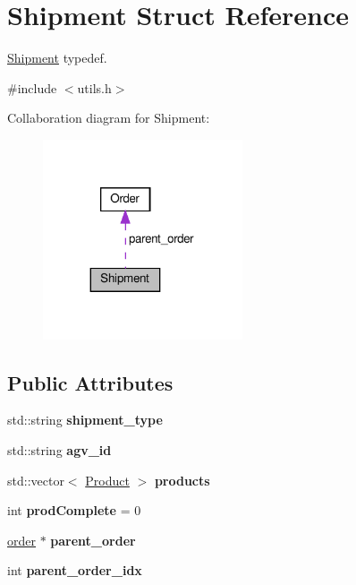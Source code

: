 \hypertarget{structShipment}{}\section{Shipment Struct Reference}
\label{structShipment}


\hyperlink{structShipment}{Shipment} typedef.  




{\ttfamily \#include $<$utils.\+h$>$}



Collaboration diagram for Shipment\+:\nopagebreak
\begin{figure}[H]
\begin{center}
\leavevmode
\includegraphics[width=167pt]{structShipment__coll__graph}
\end{center}
\end{figure}
\subsection*{Public Attributes}
\begin{DoxyCompactItemize}
\item 
\mbox{\label{structShipment_afee83324bb0718df0bad07ddd6bfa698}} 
std\+::string {\bfseries shipment\+\_\+type}
\item 
\mbox{\label{structShipment_a99c0e2efeb36ae051bebfee925076af1}} 
std\+::string {\bfseries agv\+\_\+id}
\item 
\mbox{\label{structShipment_a549d2e4b2e90019d18e55110593e790f}} 
std\+::vector$<$ \hyperlink{structProduct}{Product} $>$ {\bfseries products}
\item 
\mbox{\label{structShipment_a3d5cdc2669ff03bb010989818e5e2369}} 
int {\bfseries prod\+Complete} = 0
\item 
\mbox{\label{structShipment_a1f5c06a24c0915d76b7bea80f3bd8d31}} 
\hyperlink{utils_8h_a88b083f4969e7c61a34a7231180f9e41}{order} $\ast$ {\bfseries parent\+\_\+order}
\item 
\mbox{\label{structShipment_aac7fdf0f481c7ed76496a38f37d300ab}} 
int {\bfseries parent\+\_\+order\+\_\+idx}
\end{DoxyCompactItemize}


